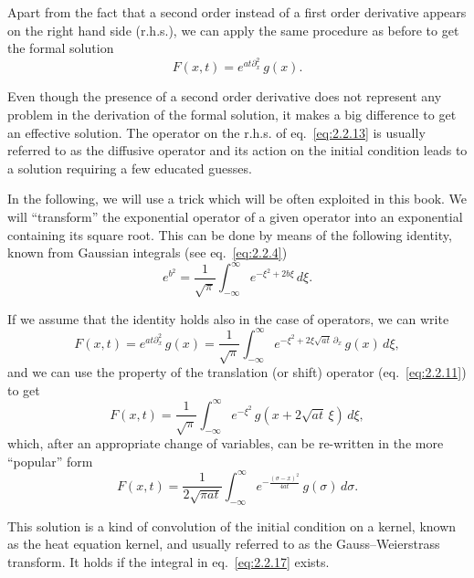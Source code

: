 Apart from the fact that a second order instead of a first order derivative appears on the right hand side (r.h.s.), we can apply the same procedure as before to get the formal solution
\begin{equation}
F(x,t)=e^{a t\partial_{x}^{2}}\,g(x).
\label{eq:2.2.13}
\end{equation}

Even though the presence of a second order derivative does not represent any problem in the derivation of the formal solution, it makes a big difference to get an effective solution. The operator on the r.h.s. of eq.~\eqref{eq:2.2.13} is usually referred to as the diffusive operator and its action on the initial condition leads to a solution requiring a few educated guesses.

In the following, we will use a trick which will be often exploited in this book. We will ``transform'' the exponential operator of a given operator into an exponential containing its square root. This can be done by means of the following identity, known from Gaussian integrals (see eq.~\eqref{eq:2.2.4})
\begin{equation}
e^{b^{2}}=\frac{1}{\sqrt{\pi}}\int_{-\infty}^{\infty}e^{-\xi^{2}+2b\xi}\,d\xi.
\label{eq:2.2.14}
\end{equation}

If we assume that the identity holds also in the case of operators, we can write
\begin{equation}
F(x,t)=e^{a t\partial_{x}^{2}}\,g(x)
=\frac{1}{\sqrt{\pi}}\int_{-\infty}^{\infty}
e^{-\xi^{2}+2\xi\sqrt{a t}\,\partial_{x}}\,g(x)\,d\xi,
\label{eq:2.2.15}
\end{equation}
and we can use the property of the translation (or shift) operator (eq.~\eqref{eq:2.2.11}) to get
\begin{equation}
F(x,t)=\frac{1}{\sqrt{\pi}}\int_{-\infty}^{\infty}
e^{-\xi^{2}}\,g(x+2\sqrt{a t}\,\xi)\,d\xi,
\label{eq:2.2.16}
\end{equation}
which, after an appropriate change of variables, can be re-written in the more ``popular'' form
\begin{equation}
F(x,t)=\frac{1}{2\sqrt{\pi a t}}
\int_{-\infty}^{\infty}e^{-\frac{(\sigma-x)^{2}}{4 a t}}\,g(\sigma)\,d\sigma.
\label{eq:2.2.17}
\end{equation}

This solution is a kind of convolution of the initial condition on a kernel, known as the heat equation kernel, and usually referred to as the Gauss--Weierstrass transform. It holds if the integral in eq.~\eqref{eq:2.2.17} exists.


